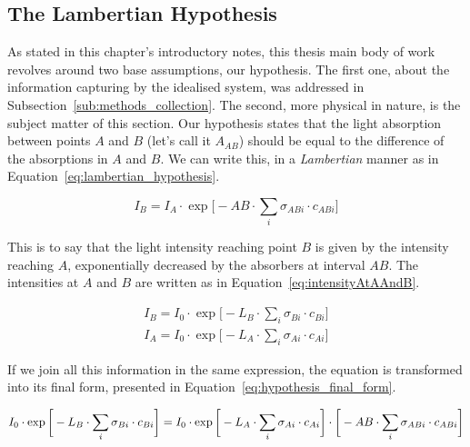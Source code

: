 \subsection{The Lambertian Hypothesis}%
\label{sub:methods_lambertian_hypothesis}

As stated in this chapter's introductory notes, this thesis main body of
work revolves around two base assumptions, our hypothesis. The first
one, about the information capturing by the idealised system, was
addressed in Subsection~\ref{sub:methods_collection}. The second, more
physical in nature, is the subject matter of this section. Our
hypothesis states that the light absorption between points $A$ and $B$
(let's call it $A_{AB}$) should be equal to the difference of the
absorptions in $A$ and $B$. We can write this, in a \emph{Lambertian}
manner as in Equation~\ref{eq:lambertian_hypothesis}.

\begin{equation}
    \label{eq:lambertian_hypothesis}
    I_B = I_A \cdot \exp \bigg[-AB \cdot \sum_i \sigma_{ABi} \cdot
    c_{ABi}\bigg]
\end{equation}

This is to say that the light intensity reaching point $B$ is given by
the intensity reaching $A$, exponentially decreased by the absorbers at
interval $AB$. The intensities at $A$ and $B$ are written as in
Equation~\ref{eq:intensityAtAAndB}.

\begin{equation}
    \begin{aligned}
        \label{eq:intensityAtAAndB}
        I_B = I_0 \cdot \exp \bigg[ -L_B \cdot \sum_i \sigma_{Bi} \cdot
        c_{Bi} \bigg]\\
        I_A = I_0 \cdot \exp \bigg[ -L_A \cdot \sum_i \sigma_{Ai} \cdot
        c_{Ai} \bigg]
    \end{aligned}
\end{equation}

If we join all this information in the same expression, the equation is
transformed into its final form, presented in
Equation~\ref{eq:hypothesis_final_form}.

\begin{equation}
    \small
    \label{eq:hypothesis_final_form}
    I_0 \cdot \exp \bigg[ -L_B \cdot \sum_i \sigma_{Bi} \cdot
            c_{Bi} \bigg] = I_0 \cdot \exp \bigg[ -L_A \cdot \sum_i \sigma_{Ai} \cdot
            c_{Ai} \bigg] \cdot \bigg[-AB \cdot \sum_i \sigma_{ABi} \cdot
            c_{ABi}\bigg]
\end{equation}

